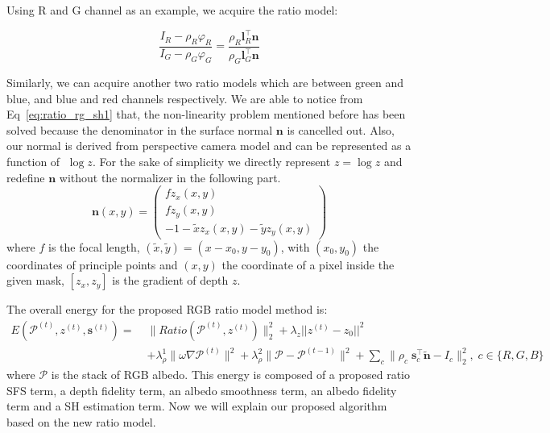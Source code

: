Using R and G channel as an example, we acquire the ratio model:

\begin{equation}\label{eq:ratio_rg_sh1}
\frac{I_R - \rho_R \varphi_R}{I_G - \rho_G \varphi_G} = \frac{\rho_R \mathbf{l}_R^\top \mathbf{n}}{\rho_G \mathbf{l}_G^\top \mathbf{n}}
\end{equation}

Similarly, we can acquire another two ratio models which are between green and blue, and blue and red channels respectively.
We are able to notice from Eq~\ref{eq:ratio_rg_sh1} that, the non-linearity problem mentioned before has been solved because the denominator in the surface normal $\mathbf{n}$ is cancelled out.
Also, our normal is derived from perspective camera model and can be represented as a function of $\; \log z$. 
For the sake of simplicity we directly represent $z = \log z$ and redefine $\mathbf{n}$ without the normalizer in the following part.
\begin{equation}\label{eq:ratio_normal}
    \mathbf{n}(x,y) =
     \begin{pmatrix}
         fz_x(x,y)\\
         fz_y(x,y)\\
         -1 - \tilde{x}z_x(x,y) - \tilde{y}z_y(x,y)
     \end{pmatrix}
\end{equation}
where $f$ is the focal length, $(\tilde{x}, \tilde{y}) = (x- x_0, y - y_0)$, with $(x_0, y_0)$ the coordinates of principle points and $(x,y)$ the coordinate of a pixel inside the given mask, $[z_x, z_y]$ is the gradient of depth $z$.

The overall energy for the proposed RGB ratio model method is:
\begin{equation}\label{eq:ratio_energy}
    \begin{split}
	E(\mathcal{P}^{(t)}, z^{(t)}, \mathbf{s}^{(t)}) = \; &\lVert Ratio(\mathcal{P}^{(t)}, z^{(t)}) \rVert^2_2 
	+ \lambda_z||z^{(t)} - z_0||^2 \\&
	+ \lambda_{\rho}^1 \lVert \omega \nabla \mathcal{P}^{(t)} \rVert^2  
	+ \lambda_{\rho}^2 \lVert \mathcal{P} - \mathcal{P}^{(t-1)}\rVert^2 
	+ \sum_{c} \lVert \rho_c \; \mathbf{s}_c^\top \tilde{\mathbf{n}} - I_c \rVert^2_2, \; c\in\{R,G,B\}
    \end{split}
\end{equation}
where $\mathcal{P}$ is the stack of RGB albedo.
This energy is composed of a proposed ratio SFS term, a depth fidelity term, an albedo smoothness term, an albedo fidelity term and a SH estimation term.
Now we will explain our proposed algorithm based on the new ratio model.

